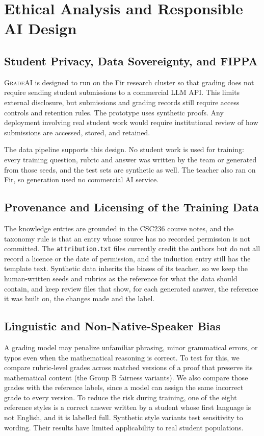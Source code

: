 \documentclass[11pt,a4paper]{article}
\newcommand{\gradeai}{\textsc{GradeAI}}
\newcommand{\file}[1]{\nolinkurl{#1}}
\newcommand{\lvl}[1]{\textsf{#1}}
\theoremstyle{definition}
\begin{document}
\section{Ethical Analysis and Responsible AI Design}\label{sec:ethics}

\subsection{Student Privacy, Data Sovereignty, and FIPPA}
\gradeai{} is designed to run on the Fir research cluster so that grading does not require sending student submissions to a commercial LLM API. This limits external disclosure, but submissions and grading records still require access controls and retention rules. The prototype uses synthetic proofs. Any deployment involving real student work would require institutional review of how submissions are accessed, stored, and retained.

The data pipeline supports this design. No student work is used for training: every training question, rubric and answer was written by the team or generated from those seeds, and the test sets are synthetic as well. The teacher also ran on Fir, so generation used no commercial AI service.

\subsection{Provenance and Licensing of the Training Data}
The knowledge entries are grounded in the CSC236 course notes, and the taxonomy rule is that an entry whose source has no recorded permission is not committed. The \file{attribution.txt} files currently credit the authors but do not all record a licence or the date of permission, and the induction entry still has the template text. Synthetic data inherits the biases of its teacher, so we keep the human-written seeds and rubrics as the reference for what the data should contain, and keep review files that show, for each generated answer, the reference it was built on, the changes made and the label.

\subsection{Linguistic and Non-Native-Speaker Bias}
A grading model may penalize unfamiliar phrasing, minor grammatical errors, or typos even when the mathematical reasoning is correct. To test for this, we compare rubric-level grades across matched versions of a proof that preserve its mathematical content (the Group B fairness variants). We also compare those grades with the reference labels, since a model can assign the same incorrect grade to every version. To reduce the risk during training, one of the eight reference styles is a correct answer written by a student whose first language is not English, and it is labelled \lvl{full}. Synthetic style variants test sensitivity to wording. Their results have limited applicability to real student populations.
\end{document}
